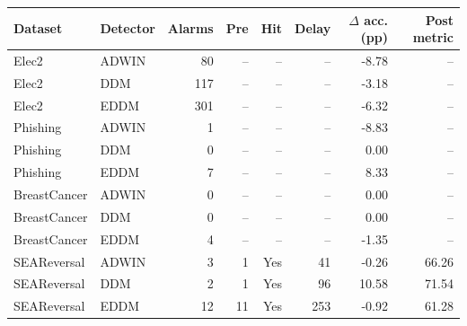 \begin{tabular}{llrrrrrr}
\toprule
Dataset & Detector & Alarms & Pre & Hit & Delay & $\Delta$ acc. (pp) & Post metric \\
\midrule
Elec2 & ADWIN & 80 & -- & -- & -- & -8.78 & -- \\
Elec2 & DDM & 117 & -- & -- & -- & -3.18 & -- \\
Elec2 & EDDM & 301 & -- & -- & -- & -6.32 & -- \\
Phishing & ADWIN & 1 & -- & -- & -- & -8.83 & -- \\
Phishing & DDM & 0 & -- & -- & -- & 0.00 & -- \\
Phishing & EDDM & 7 & -- & -- & -- & 8.33 & -- \\
BreastCancer & ADWIN & 0 & -- & -- & -- & 0.00 & -- \\
BreastCancer & DDM & 0 & -- & -- & -- & 0.00 & -- \\
BreastCancer & EDDM & 4 & -- & -- & -- & -1.35 & -- \\
SEAReversal & ADWIN & 3 & 1 & Yes & 41 & -0.26 & 66.26 \\
SEAReversal & DDM & 2 & 1 & Yes & 96 & 10.58 & 71.54 \\
SEAReversal & EDDM & 12 & 11 & Yes & 253 & -0.92 & 61.28 \\
\bottomrule
\end{tabular}
